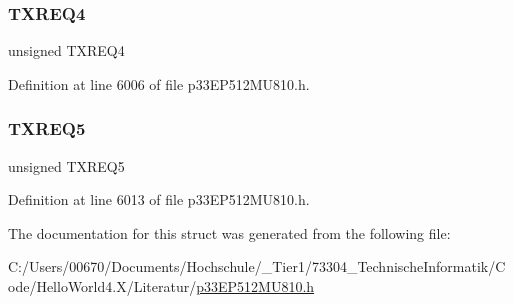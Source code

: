 \mbox{\label{structtag_c2_t_r45_c_o_n_b_i_t_s_adf240a43f250ec1a7e61ad9e8b9a8ffc}} 
\subsubsection{\texorpdfstring{T\+X\+R\+E\+Q4}{TXREQ4}}
{\footnotesize\ttfamily unsigned T\+X\+R\+E\+Q4}



Definition at line 6006 of file p33\+E\+P512\+M\+U810.\+h.

\mbox{\label{structtag_c2_t_r45_c_o_n_b_i_t_s_a9ad70609ad3034a380a9fa1ad06e7d17}} 
\subsubsection{\texorpdfstring{T\+X\+R\+E\+Q5}{TXREQ5}}
{\footnotesize\ttfamily unsigned T\+X\+R\+E\+Q5}



Definition at line 6013 of file p33\+E\+P512\+M\+U810.\+h.



The documentation for this struct was generated from the following file\+:\begin{DoxyCompactItemize}
\item 
C\+:/\+Users/00670/\+Documents/\+Hochschule/\+\_\+\+Tier1/73304\+\_\+\+Technische\+Informatik/\+Code/\+Hello\+World4.\+X/\+Literatur/\hyperlink{p33_e_p512_m_u810_8h}{p33\+E\+P512\+M\+U810.\+h}\end{DoxyCompactItemize}

